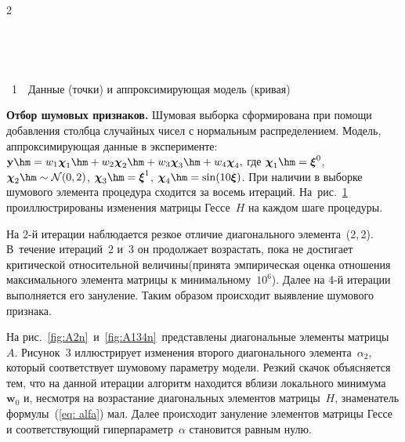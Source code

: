 \begin{multicols}{2}
\setcounter{figure}{1}
\begin{figure}[b] %
\vspace*{-3pt}
 \begin{center}
 \mbox{%
 \epsfxsize=161.853mm
 }
 \end{center}
 \vspace*{-9pt}
\label{fig:noise}
\end{figure}


\begin{center}  %
 \mbox{%
 \epsfxsize=77.76mm
 }
 \end{center}
{{\figurename~1}\ \ \small{Данные (точки) и аппроксимирующая модель (кривая)}}




\vspace*{12pt}





\smallskip

\textbf{Отбор шумовых признаков.}
Шумовая выборка сформирована при помощи добавления столбца случайных
чисел с нормальным распределением. Модель, аппроксимирующая данные
в эксперименте:
$\mathbf{y}\hm=w_{1}\boldsymbol{\chi}_{1}\hm+w_{2}\boldsymbol{\chi}_{2}
\hm +w_{3}\boldsymbol{\chi}_{3}\hm+w_{4}\boldsymbol{\chi}_{4},$
где $\boldsymbol{\chi}_1\hm=\boldsymbol{\xi}^0$,
$\boldsymbol{\chi}_2\hm\sim\mathcal{N}(0,2)$,
$\boldsymbol{\chi}_3\hm=\boldsymbol{\xi}^1$,
$\boldsymbol{\chi}_4\hm=\sin(10\boldsymbol{\xi})$. При наличии
в выборке шумового элемента процедура сходится за восемь итераций.
На~рис.~\ref{fig:noise} про\-ил\-люст\-ри\-ро\-ва\-ны изменения матрицы
Гессе~$H$ на каждом шаге процедуры.


На 2-й итерации наблюдается резкое отличие диагонального
элемента~(2,\,2). В~течение итераций~2 и~3 он продолжает возрастать,
пока не достигает критической относительной величины\linebreak (принята
эмпирическая оценка отношения максимального элемента матрицы
к минимальному~$10^6$). Далее на 4-й итерации выполняется его
зануление. Таким образом происходит выявление шумового приз\-нака.

На рис.~\ref{fig:A2n}~и~\ref{fig:A134n}~представлены диагональные
элементы матрицы~$A$. Рисунок~3 иллюстрирует изменения второго
диагонального элемента~$\alpha_2$, который соответствует шумовому
параметру модели. Резкий скачок объясняется тем, что на данной
итерации алгоритм находится вблизи локального
минимума~$\mathbf{w}_0$ и, несмотря на возрастание диагональных
элементов матрицы~$H$, знаменатель формулы~(\ref{eq: alfa}) мал.
Далее происходит зануление элементов мат\-ри\-цы Гессе и
соответствующий гиперпараметр~$\alpha$ становится равным нулю.


\end{multicols}
